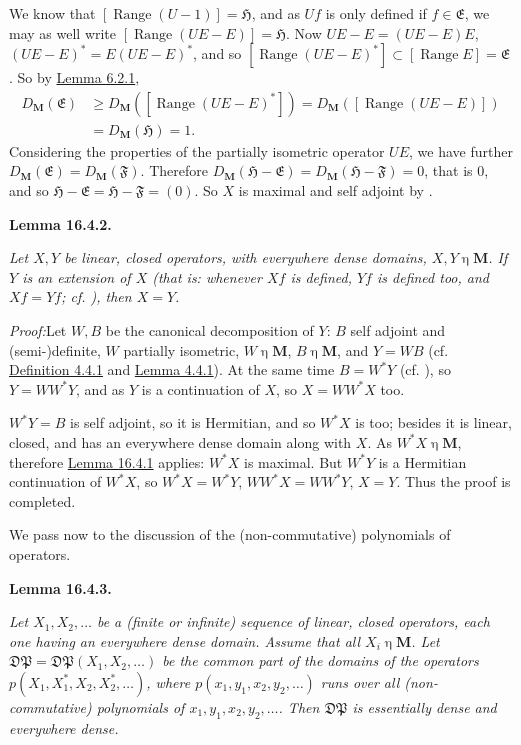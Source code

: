 \documentclass[12pt,b5paper,twoside]{article}
\newcommand{\Hspace}{\mathfrak H}
\newcommand{\M}{\mathbf M}
\newcommand{\Lemma}[1]{%
  \par\smallskip\noindent\phantomsection\label{lem:#1}\textbf{Lemma #1.}\enspace
}
\newcommand{\Proof}{\par\noindent\textit{Proof:}\enspace}
\newcommand{\defref}[1]{\hyperref[def:#1]{Definition #1}}
\newcommand{\lemref}[1]{\hyperref[lem:#1]{Lemma #1}}
\begin{document}
We know that \([\operatorname{Range}(U-1)]=\Hspace\), and as \(Uf\) is only
defined if \(f\in\mathfrak E\), we may as well write
\([\operatorname{Range}(UE-E)]=\Hspace\). Now
\(UE-E=(UE-E)E\), \((UE-E)^*=E(UE-E)^*\), and so
\([\operatorname{Range}(UE-E)^*]\subset[\operatorname{Range}E]
=\mathfrak E\). So by \lemref{6.2.1},
\[
\begin{aligned}
D_{\M}(\mathfrak E)
 &\geq D_{\M}([\operatorname{Range}(UE-E)^*])
  =D_{\M}([\operatorname{Range}(UE-E)])\\
 &=D_{\M}(\Hspace)=1.
\end{aligned}
\]
Considering the properties of the partially isometric operator \(UE\), we
have further \(D_{\M}(\mathfrak E)=D_{\M}(\mathfrak F)\). Therefore
\(D_{\M}(\Hspace-\mathfrak E)=D_{\M}(\Hspace-\mathfrak F)=0\), that is
\(0\), and so \(\Hspace-\mathfrak E=\Hspace-\mathfrak F=(0)\). So \(X\)
is maximal and self adjoint by \cite[p.~88]{ref16}.

\Lemma{16.4.2}
{\itshape Let \(X,Y\) be linear, closed operators, with everywhere dense
domains, \(X,Y\mathbin\eta\M\). If \(Y\) is an extension of \(X\) (that is:
whenever \(Xf\) is defined, \(Yf\) is defined too, and \(Xf=Yf\); cf.
\cite[p.~70]{ref15}), then \(X=Y\).}

\Proof Let \(W,B\) be the canonical decomposition of \(Y\): \(B\) self
adjoint and (semi-)definite, \(W\) partially isometric,
\(W\mathbin\eta\M\), \(B\mathbin\eta\M\), and \(Y=WB\) (cf.
\defref{4.4.1} and \lemref{4.4.1}). At the same time \(B=W^*Y\) (cf.
\cite[p.~306]{ref21}), so \(Y=W W^*Y\), and as \(Y\) is a continuation of
\(X\), so \(X=W W^*X\) too.

\(W^*Y=B\) is self adjoint, so it is Hermitian, and so \(W^*X\) is too;
besides it is linear, closed, and has an everywhere dense domain along with
\(X\). As \(W^*X\mathbin\eta\M\), therefore \lemref{16.4.1} applies:
\(W^*X\) is maximal. But \(W^*Y\) is a Hermitian continuation of \(W^*X\),
so \(W^*X=W^*Y\), \(WW^*X=WW^*Y\), \(X=Y\). Thus the proof is completed.

We pass now to the discussion of the (non-commutative) polynomials of
operators.

\Lemma{16.4.3}
{\itshape Let \(X_1,X_2,\ldots\) be a (finite or infinite) sequence of
linear, closed operators, each one having an everywhere dense domain. Assume
that all \(X_i\mathbin\eta\M\). Let
\(\mathfrak D\mathfrak P=\mathfrak D\mathfrak P(X_1,X_2,\ldots)\) be the
common part of the domains of the operators
\(p(X_1,X_1^*,X_2,X_2^*,\ldots)\), where
\(p(x_1,y_1,x_2,y_2,\ldots)\) runs over all (non-commutative) polynomials of
\(x_1,y_1,x_2,y_2,\ldots\). Then \(\mathfrak D\mathfrak P\) is essentially
dense and everywhere dense.}
\end{document}
